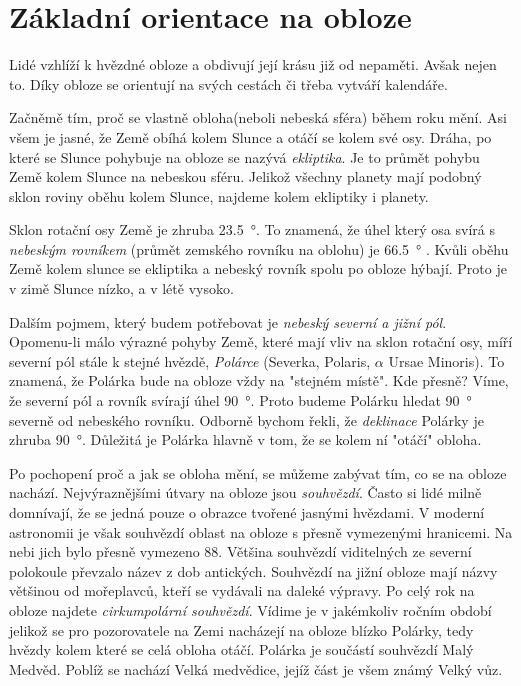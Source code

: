 \documentclass[crop=false]{standalone}
\begin{document}
\section*{Základní orientace na obloze}
\quad

Lidé vzhlíží k hvězdné obloze a obdivují její krásu již od nepaměti.
Avšak nejen to.
Díky obloze se orientují na svých cestách či třeba vytváří kalendáře.

Začněmě tím, proč se vlastně obloha(neboli nebeská sféra) během roku mění.
Asi všem je jasné, že Země obíhá kolem Slunce a otáčí se kolem své osy.
Dráha, po které se Slunce pohybuje na obloze se nazývá \textit{ekliptika}. Je to průmět pohybu Země kolem Slunce na nebeskou sféru.
Jelikož všechny planety mají podobný sklon roviny oběhu kolem Slunce, najdeme kolem ekliptiky i planety.

Sklon rotační osy Země je zhruba \qty{23,5}{\degree}.
To znamená, že úhel který osa svírá s \textit{nebeským rovníkem} (průmět zemského rovníku na oblohu) je \qty{66,5}{\degree} . 
Kvůli oběhu Země kolem slunce se ekliptika a nebeský rovník spolu po obloze hýbají.
Proto je v zimě Slunce nízko, a v létě vysoko.

Dalším pojmem, který budem potřebovat je \textit{nebeský severní a jižní pól}.
Opomenu-li málo výrazné pohyby Země, které mají vliv na sklon rotační osy, míří severní pól stále k stejné hvězdě, \textit{Polárce} (Severka, Polaris, $\alpha$ Ursae Minoris).
To znamená, že Polárka bude na obloze vždy na "stejném místě".
Kde přesně?
Víme, že severní pól a rovník svírají úhel \qty{90}{\degree}. Proto budeme Polárku hledat \qty{90}{\degree} severně od nebeského rovníku. 
Odborně bychom řekli, že \textit{deklinace} Polárky je zhruba \qty{90}{\degree}.
Důležitá je Polárka hlavně v tom, že se kolem ní "otáčí" obloha. 

Po pochopení proč a jak se obloha mění, se můžeme zabývat tím, co se na obloze nachází.
Nejvýraznějšími útvary na obloze jsou \textit{souhvězdí}.
Často si lidé milně domnívají, že se jedná pouze o obrazce tvořené jasnými hvězdami.
V moderní astronomii je však souhvězdí oblast na obloze s přesně vymezenými hranicemi.
Na nebi jich bylo přesně vymezeno 88. Většina souhvězdí  viditelných ze  severní polokoule převzalo název z dob antických. Souhvězdí na jižní obloze mají názvy většinou od mořeplavců, kteří se vydávali na daleké výpravy.
Po celý rok na obloze najdete \textit{cirkumpolární souhvězdí}. Vídime je v jakémkoliv ročním období jelikož se pro pozorovatele na Zemi nacházejí na obloze blízko Polárky, tedy hvězdy kolem které se celá obloha otáčí.
Polárka je součástí souhvězdí Malý Medvěd. Poblíž se nachází Velká medvědice, jejíž část je všem známý Velký vůz.
\end{document}
